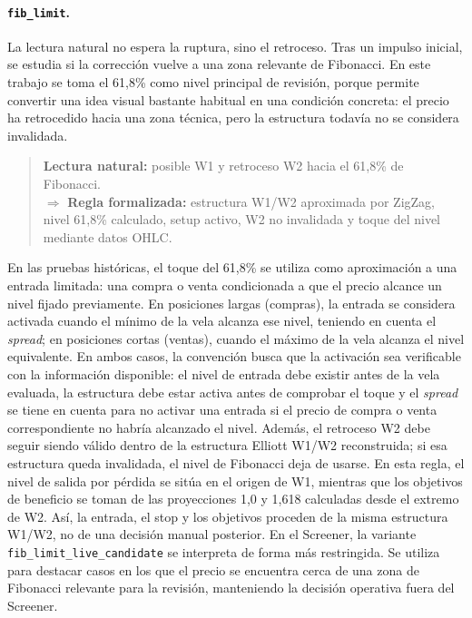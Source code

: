 \paragraph{\texttt{fib\_limit}.}
La lectura natural no espera la ruptura, sino el retroceso. Tras un impulso
inicial, se estudia si la correcci\'on vuelve a una zona relevante de Fibonacci.
En este trabajo se toma el 61,8\% como nivel principal de revisi\'on, porque
permite convertir una idea visual bastante habitual en una condici\'on concreta:
el precio ha retrocedido hacia una zona t\'ecnica, pero la estructura todav\'ia no
se considera invalidada.

\begin{quote}
\small
\textbf{Lectura natural:} posible W1 y retroceso W2 hacia el 61,8\% de
Fibonacci.\\
\(\Rightarrow\)
\textbf{Regla formalizada:} estructura W1/W2 aproximada por ZigZag, nivel
61,8\% calculado, setup activo, W2 no invalidada y toque del nivel mediante
datos OHLC.
\end{quote}

En las pruebas hist\'oricas, el toque del 61,8\% se utiliza como aproximaci\'on a
una entrada limitada: una compra o venta condicionada a que el precio alcance un
nivel fijado previamente. En posiciones largas (compras), la entrada se
considera activada cuando el m\'inimo de la vela alcanza ese nivel, teniendo en
cuenta el \textit{spread}; en posiciones cortas (ventas), cuando el m\'aximo de la
vela alcanza el nivel equivalente. En ambos casos, la convenci\'on busca que la
activaci\'on sea verificable con la informaci\'on disponible: el nivel de entrada
debe existir antes de la vela evaluada, la estructura debe estar activa antes de
comprobar el toque y el \textit{spread} se tiene en cuenta para no activar una
entrada si el precio de compra o venta correspondiente no habr\'ia alcanzado el
nivel. Adem\'as, el retroceso W2 debe seguir siendo v\'alido dentro de la
estructura Elliott W1/W2 reconstruida; si esa estructura queda invalidada, el
nivel de Fibonacci deja de usarse. En esta regla, el nivel de salida por p\'erdida
se sit\'ua en el origen de W1, mientras que los objetivos de beneficio se toman
de las proyecciones 1,0 y 1,618 calculadas desde el extremo de W2. As\'i, la
entrada, el stop y los objetivos proceden de la misma estructura W1/W2, no de
una decisi\'on manual posterior. En el Screener, la
variante
\texttt{fib\_limit\_live\_candidate} se interpreta de forma m\'as restringida.
Se utiliza para destacar casos en los que el precio se encuentra cerca de una
zona de Fibonacci relevante para la revisi\'on, manteniendo la decisi\'on
operativa fuera del Screener.

